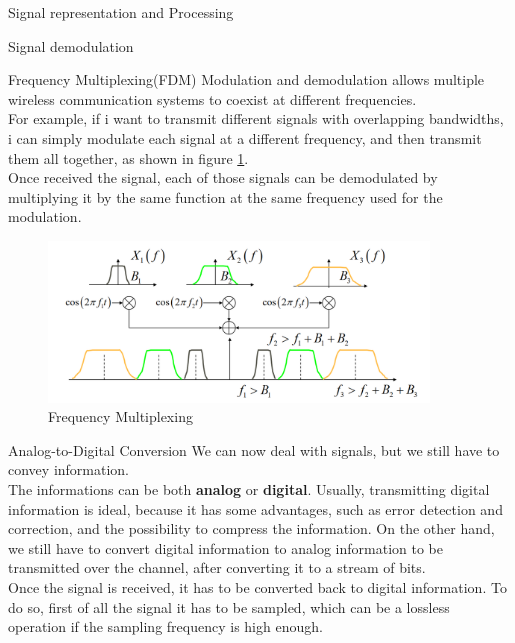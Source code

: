 \begin{section}{Signal representation and Processing}
\begin{subsection}{Signal demodulation}
    \end{subsection}
    \begin{subsection}{Frequency Multiplexing(FDM)}
      \label{subsec:FDM}
      Modulation and demodulation allows multiple wireless communication systems to coexist at different
      frequencies.\\
      For example, if i want to transmit different signals with overlapping bandwidths, i can simply
      modulate each signal at a different frequency, and then transmit them all together, as shown in
      figure \ref{fig:FDM}.\\
      Once received the signal, each of those signals can be demodulated by multiplying it by the 
      same function at the same frequency used for the modulation.\\
      \begin{figure}[h]
        \centering
        \includegraphics[width=0.9\textwidth]{img/wireless/FDM.png}
        \caption{Frequency Multiplexing}
        \label{fig:FDM}
      \end{figure}
    \end{subsection}
    \begin{subsection}{Analog-to-Digital Conversion}
      We can now deal with signals, but we still have to convey information.\\
      The informations can be both \textbf{analog} or \textbf{digital}. Usually, transmitting digital
      information is ideal, because it has some advantages, such as error detection and correction,
      and the possibility to compress the information. On the other hand, we still have to convert
      digital information to analog information to be transmitted over the channel, after converting
      it to a stream of bits.\\
      Once the signal is received, it has to be converted back to digital information. To do so,
      first of all the signal it has to be sampled, which can be a lossless operation if the sampling
      frequency is high enough.\\

\end{subsection}
\end{section}
